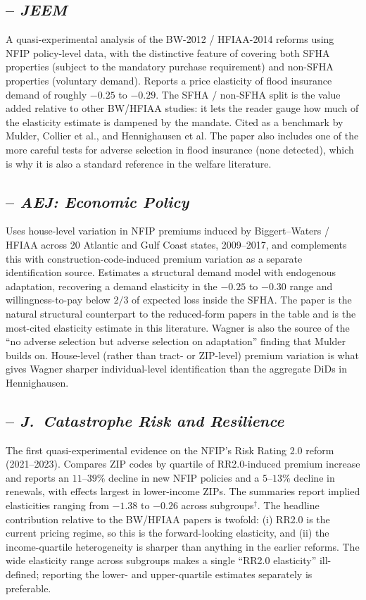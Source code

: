 \documentclass[11pt]{article}
\begin{document}
\subsection*{\citet{bradt2021} -- \textit{JEEM}}
A quasi-experimental analysis of the BW-2012 / HFIAA-2014 reforms using NFIP
policy-level data, with the distinctive feature of covering both SFHA properties
(subject to the mandatory purchase requirement) and non-SFHA properties
(voluntary demand). Reports a price elasticity of flood insurance demand of
roughly $-0.25$ to $-0.29$. The SFHA / non-SFHA split is the value added relative
to other BW/HFIAA studies: it lets the reader gauge how much of the elasticity
estimate is dampened by the mandate. Cited as a benchmark by Mulder, Collier
et al., and Hennighausen et al. The paper also includes one of the more careful
tests for adverse selection in flood insurance (none detected), which is why
it is also a standard reference in the welfare literature.

\subsection*{\citet{wagner2022} -- \textit{AEJ: Economic Policy}}
Uses house-level variation in NFIP premiums induced by Biggert--Waters / HFIAA
across 20 Atlantic and Gulf Coast states, 2009--2017, and complements this with
construction-code-induced premium variation as a separate identification source.
Estimates a structural demand model with endogenous adaptation, recovering a
demand elasticity in the $-0.25$ to $-0.30$ range and willingness-to-pay below
$2/3$ of expected loss inside the SFHA. The paper is the natural structural
counterpart to the reduced-form papers in the table and is the most-cited
elasticity estimate in this literature. Wagner is also the source of the
``no adverse selection but adverse selection on adaptation'' finding that
Mulder builds on. House-level (rather than tract- or ZIP-level) premium
variation is what gives Wagner sharper individual-level identification than
the aggregate DiDs in Hennighausen.

\subsection*{\citet{gourevitch2025} -- \textit{J.~Catastrophe Risk and Resilience}}
The first quasi-experimental evidence on the NFIP's Risk Rating 2.0 reform
(2021--2023). Compares ZIP codes by quartile of RR2.0-induced premium increase
and reports an $11$--$39\%$ decline in new NFIP policies and a $5$--$13\%$
decline in renewals, with effects largest in lower-income ZIPs. The summaries
report implied elasticities ranging from $-1.38$ to $-0.26$ across
subgroups$^\dagger$. The headline contribution relative to the BW/HFIAA papers
is twofold: (i) RR2.0 is the current pricing regime, so this is the
forward-looking elasticity, and (ii) the income-quartile heterogeneity is
sharper than anything in the earlier reforms. The wide elasticity range across
subgroups makes a single ``RR2.0 elasticity'' ill-defined; reporting the lower-
and upper-quartile estimates separately is preferable.
\end{document}
